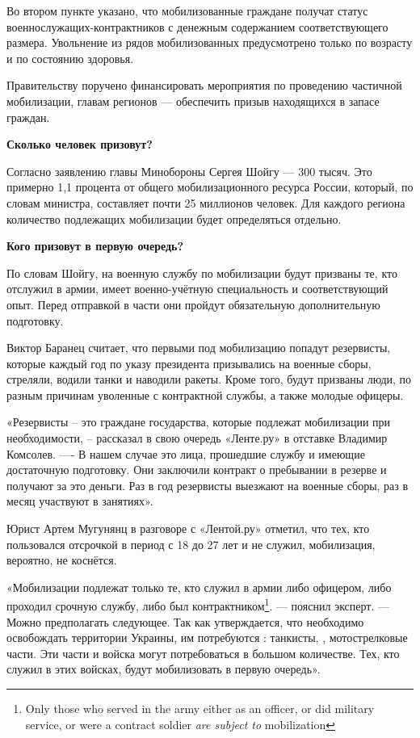 Во втором пункте указано, что мобилизованные граждане получат статус военнослужащих-контрактников с денежным содержанием соответствующего размера. Увольнение из рядов мобилизованных предусмотрено только по возрасту и по состоянию здоровья.

Правительству поручено финансировать мероприятия по проведению частичной мобилизации, главам регионов — обеспечить призыв находящихся в запасе граждан.

\textbf{Сколько человек призовут?}

Согласно заявлению главы Минобороны Сергея Шойгу — 300 тысяч. Это примерно 1,1 процента от общего мобилизационного ресурса России, который, по словам министра, составляет почти 25 миллионов человек. Для каждого региона количество подлежащих мобилизации будет определяться отдельно.

\textbf{Кого призовут в первую очередь?}

По словам Шойгу, на военную службу по мобилизации будут призваны те, кто отслужил в армии, имеет военно-учётную специальность и соответствующий опыт. Перед отправкой в части они пройдут обязательную дополнительную подготовку.

  Виктор Баранец считает, что первыми под мобилизацию попадут резервисты, которые каждый год по указу президента призывались на военные сборы, стреляли, водили танки и наводили ракеты. Кроме того, будут призваны люди, по разным причинам уволенные с контрактной службы, а также молодые офицеры.

«Резервисты -- это  граждане государства, которые подлежат мобилизации при необходимости, -- рассказал в свою очередь «Ленте.ру»  в отставке Владимир Комсолев. —- В нашем случае это лица, прошедшие службу и имеющие достаточную подготовку. Они заключили контракт о пребывании в резерве и получают за это деньги. Раз в год резервисты выезжают на военные сборы, раз в месяц участвуют в занятиях».

Юрист Артем Мугунянц в разговоре с «Лентой.ру» отметил, что тех, кто пользовался отсрочкой в период с 18 до 27 лет и не служил, мобилизация, вероятно, не коснётся.

«Мобилизации подлежат только те, кто служил в армии либо офицером, либо проходил срочную службу, либо был контрактником\footnote{Only those who served in the army either as an officer, or did military service, or were a contract soldier \textit{are subject to} mobilization}. — пояснил эксперт. — Можно предполагать следующее. Так как утверждается, что необходимо освобождать территории Украины, им потребуются : танкисты, , мотострелковые части. Эти части и войска могут потребоваться в большом количестве. Тех, кто служил в этих войсках, будут мобилизовать в первую очередь».

